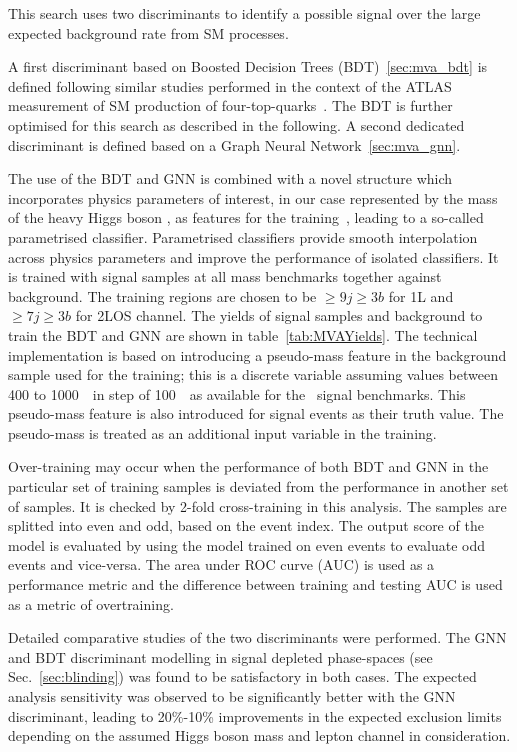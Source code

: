 %
This search uses two discriminants to identify a possible signal over the large expected background rate from SM processes. 

A first discriminant based on Boosted Decision Trees (BDT)~\ref{sec:mva_bdt} is defined following similar studies performed in the context of the ATLAS measurement of SM production of four-top-quarks~\cite{ATLAS-CONF-2021-013}. The BDT is further optimised for this search as described in the following. A second dedicated discriminant is defined based on a Graph Neural Network~\ref{sec:mva_gnn}. 

The use of the BDT and GNN is combined with a novel structure which incorporates physics parameters of interest, in our case represented by the mass of the heavy Higgs boson \mH, as features for the training~\cite{Baldi_2016}, leading to a so-called parametrised classifier.
Parametrised classifiers provide smooth interpolation across physics parameters and improve the performance of isolated classifiers.
It is trained with signal samples at all mass benchmarks together against \ttbar background.
The training regions are chosen to be $\geq9j\geq3b$ for 1L and $\geq7j\geq3b$ for 2LOS channel.
The yields of signal samples and \ttbar background to train the BDT and GNN are shown in table~\ref{tab:MVAYields}.
The technical implementation is based on introducing a pseudo-mass feature in the background sample used for the training; this is a discrete variable assuming values between 400 to 1000~\gev\ in step of 100~\gev\ as available for the \ttH\ signal benchmarks. 
This pseudo-mass feature is also introduced for signal events as their truth \mH value. The pseudo-mass is treated as an additional input variable in the training. 

Over-training may occur when the performance of both BDT and GNN in the particular set of training samples is deviated from the performance in another set of samples.
It is checked by 2-fold cross-training in this analysis.
The samples are splitted into even and odd, based on the event index.
The output score of the model is evaluated by using the model trained on even events to evaluate odd events and vice-versa.
The area under ROC curve (AUC) is used as a performance metric and the difference between training and testing AUC is used as a metric of overtraining. 

Detailed comparative studies of the two discriminants were performed. The GNN and BDT discriminant modelling in signal depleted phase-spaces (see Sec.~\ref{sec:blinding}) was found to be satisfactory in both cases. The expected analysis sensitivity was observed to be significantly better with the GNN discriminant, leading to 20\%-10\% improvements in the expected exclusion limits depending on the assumed Higgs boson mass and lepton channel in consideration.  

